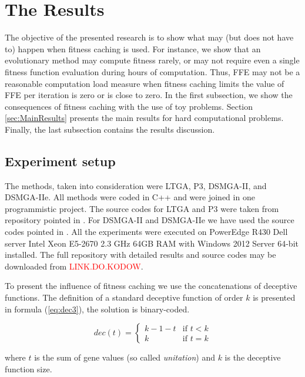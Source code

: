\section{The Results}

The objective of the presented research is to show what may (but does not have to) happen when fitness caching is used. For instance, we show that an evolutionary method may compute fitness rarely, or may not require even a single fitness function evaluation during hours of computation. Thus, FFE may not be a reasonable computation load measure when fitness caching limits the value of FFE per iteration is zero or is close to zero. In the first subsection, we show the consequences of fitness caching with the use of toy problems. Section \ref{sec:MainResults} presents the main results for hard computational problems. Finally, the last subsection contains the results discussion.


\subsection{Experiment setup}

The methods, taken into consideration were LTGA, P3, DSMGA-II, and DSMGA-IIe. All methods were coded in C++ and were joined in one programmistic project. The source codes for LTGA and P3 were taken from repository pointed in \cite{P3Original}. For DSMGA-II and DSMGA-IIe we have used the source codes pointed in \cite{dsmga2,dsmga2e}. All the experiments were executed on PowerEdge R430 Dell server Intel Xeon E5-2670 2.3 GHz 64GB RAM with Windows 2012 Server 64-bit installed. The full repository with detailed results and source codes may be downloaded from \textcolor{red}{LINK.DO.KODOW}.\par

To present the influence of fitness caching we use the concatenations of deceptive functions. The definition of a standard deceptive function
of order $k$ is presented in formula (\ref{eq:dec3}), the solution is binary-coded.

\begin{equation}
\label{eq:dec3}
\mathit{dec(t)}=
\begin{cases}
k - 1 - t & \text{if } t < k\\
k & \text{if } t = k
\end{cases}
\end{equation}

where $t$ is the sum of gene values (so called \textit{unitation}) and $k$ is the deceptive function size.\par

